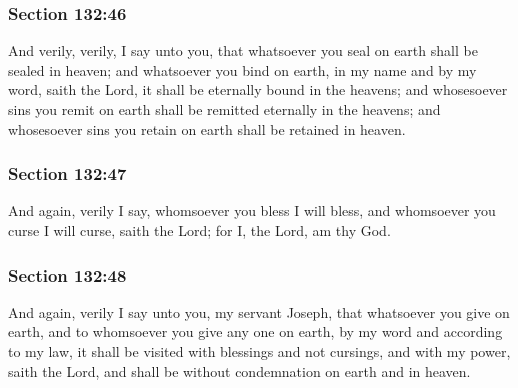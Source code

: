 	\subsubsection{Section 132:46} %
		\label{DC132-46}

		And verily, verily, I say unto you, that whatsoever you seal on earth shall be sealed in heaven; and whatsoever you bind on earth, in my name and by my word, saith the Lord, it shall be eternally bound in the heavens; and whosesoever sins you remit on earth shall be remitted eternally in the heavens; and whosesoever sins you retain on earth shall be retained in heaven.


	\subsubsection{Section 132:47} %
		\label{DC132-47}

		And again, verily I say, whomsoever you bless I will bless, and whomsoever you curse I will curse, saith the Lord; for I, the Lord, am thy God.


	\subsubsection{Section 132:48} %
		\label{DC132-48}

		And again, verily I say unto you, my servant Joseph, that whatsoever you give on earth, and to whomsoever you give any one on earth, by my word and according to my law, it shall be visited with blessings and not cursings, and with my power, saith the Lord, and shall be without condemnation on earth and in heaven.

